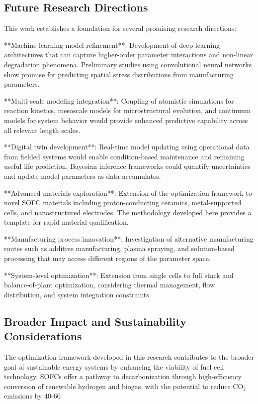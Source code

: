 \documentclass[conference]{IEEEtran}
\begin{document}
\subsection{Future Research Directions}

This work establishes a foundation for several promising research directions:

**Machine learning model refinement**: Development of deep learning architectures that can capture higher-order parameter interactions and non-linear degradation phenomena. Preliminary studies using convolutional neural networks show promise for predicting spatial stress distributions from manufacturing parameters.

**Multi-scale modeling integration**: Coupling of atomistic simulations for reaction kinetics, mesoscale models for microstructural evolution, and continuum models for system behavior would provide enhanced predictive capability across all relevant length scales.

**Digital twin development**: Real-time model updating using operational data from fielded systems would enable condition-based maintenance and remaining useful life prediction. Bayesian inference frameworks could quantify uncertainties and update model parameters as data accumulates.

**Advanced materials exploration**: Extension of the optimization framework to novel SOFC materials including proton-conducting ceramics, metal-supported cells, and nanostructured electrodes. The methodology developed here provides a template for rapid material qualification.

**Manufacturing process innovation**: Investigation of alternative manufacturing routes such as additive manufacturing, plasma spraying, and solution-based processing that may access different regions of the parameter space.

**System-level optimization**: Extension from single cells to full stack and balance-of-plant optimization, considering thermal management, flow distribution, and system integration constraints.

\subsection{Broader Impact and Sustainability Considerations}

The optimization framework developed in this research contributes to the broader goal of sustainable energy systems by enhancing the viability of fuel cell technology. SOFCs offer a pathway to decarbonization through high-efficiency conversion of renewable hydrogen and biogas, with the potential to reduce CO₂ emissions by 40-60%
\end{document}
